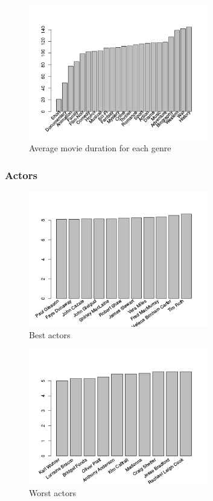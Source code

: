 \begin{figure}[!h]
\begin{center}
\includegraphics[width=0.70\textwidth]{../src/pre-processing/stats/results/dureeByGenre.png}
\end{center}
\caption{Average movie duration for each genre}
\label{fig:dureeByGenre}
\end{figure}


\newpage
\subsubsection{Actors}
\label{subs:Actors}

\begin{figure}[!h]
\begin{center}
\includegraphics[width=0.70\textwidth]{../src/pre-processing/stats/results/bestActors.png}
\end{center}
\caption{Best actors}
\label{fig:bestActors}
\end{figure}

\begin{figure}[!h]
\begin{center}
\includegraphics[width=0.70\textwidth]{../src/pre-processing/stats/results/worstActors.png}
\end{center}
\caption{Worst actors}
\label{fig:worstActors}
\end{figure}
